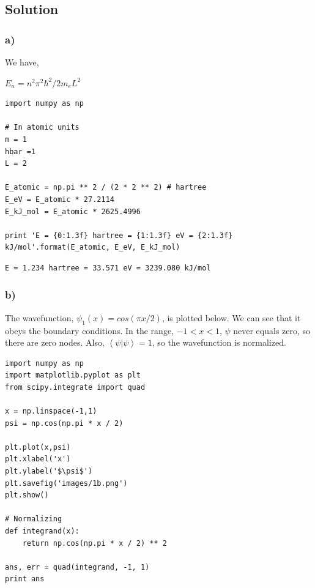 \documentclass[11pt]{article}
\begin{document}
\subsection{Solution}
\label{sec-1-1}

\subsubsection{a)}
\label{sec-1-1-1}

We have,

$E_{n} = n^{2} \pi^{2} \hbar^{2} / 2 m_{e} L^{2}$

\begin{verbatim}
import numpy as np

# In atomic units
m = 1
hbar =1
L = 2

E_atomic = np.pi ** 2 / (2 * 2 ** 2) # hartree
E_eV = E_atomic * 27.2114
E_kJ_mol = E_atomic * 2625.4996

print 'E = {0:1.3f} hartree = {1:1.3f} eV = {2:1.3f} kJ/mol'.format(E_atomic, E_eV, E_kJ_mol)
\end{verbatim}

\begin{verbatim}
E = 1.234 hartree = 33.571 eV = 3239.080 kJ/mol
\end{verbatim}

\subsubsection{b)}
\label{sec-1-1-2}
The wavefunction, $\psi_{1}(x) = cos (\pi x/2)$, is plotted below. We can see that it obeys the boundary conditions. In the range, $-1 < x < 1$, $\psi$ never equals zero, so there are zero nodes. Also, $\left<\psi|\psi\right> = 1$, so the wavefunction is normalized.

\begin{verbatim}
import numpy as np
import matplotlib.pyplot as plt
from scipy.integrate import quad

x = np.linspace(-1,1)
psi = np.cos(np.pi * x / 2)

plt.plot(x,psi)
plt.xlabel('x')
plt.ylabel('$\psi$')
plt.savefig('images/1b.png')
plt.show()

# Normalizing
def integrand(x):
    return np.cos(np.pi * x / 2) ** 2

ans, err = quad(integrand, -1, 1)
print ans
\end{verbatim}
\end{document}
